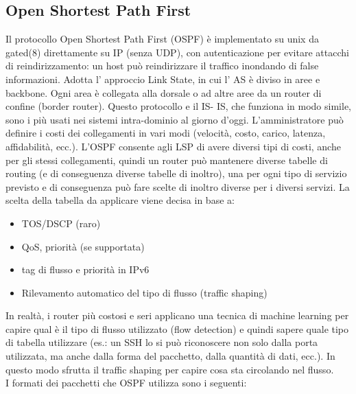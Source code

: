\subsection{Open Shortest Path First}
Il protocollo Open Shortest Path First (OSPF) è implementato su unix da gated(8) direttamente su IP (senza UDP), con autenticazione per evitare attacchi di reindirizzamento: un host può reindirizzare il traffico inondando di false informazioni. Adotta l’ approccio Link State, in cui l’ AS è diviso in aree e backbone. Ogni area è collegata alla dorsale o ad altre aree da un router di confine (border router). Questo protocollo e il IS- IS, che funziona in modo simile, sono i più usati nei sistemi intra-dominio al giorno d’oggi. L’amministratore può definire i costi dei collegamenti in vari modi (velocità, costo, carico, latenza, affidabilità, ecc.). L’OSPF consente agli LSP di avere diversi tipi di costi, anche per gli stessi collegamenti, quindi un router può mantenere diverse tabelle di routing (e di conseguenza diverse tabelle di inoltro), una per ogni tipo di servizio previsto e di conseguenza può fare scelte di inoltro diverse per i diversi servizi. La scelta della tabella da applicare viene decisa in base a:
\begin{itemize}
  \item TOS/DSCP (raro)
  \item QoS, priorità (se supportata)
  \item tag di flusso e priorità in IPv6
  \item Rilevamento automatico del tipo di flusso (traffic shaping)
\end{itemize}
In realtà, i router più costosi e seri applicano una tecnica di machine learning per capire qual è il tipo di flusso
utilizzato (flow detection) e quindi sapere quale tipo di tabella utilizzare (es.: un SSH lo si può riconoscere non
solo dalla porta utilizzata, ma anche dalla forma del pacchetto, dalla quantità di dati, ecc.). In questo modo
sfrutta il traffic shaping per capire cosa sta circolando nel flusso. \\
I formati dei pacchetti che OSPF utilizza sono i seguenti:

